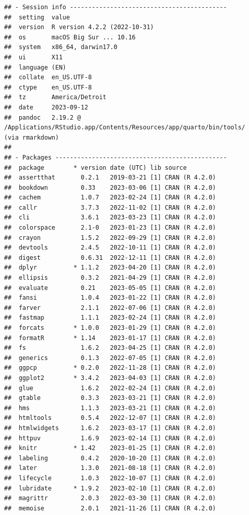 \documentclass[print]{nuthesis}
\begin{document}
\begin{verbatim}
## - Session info -------------------------------------------
##  setting  value
##  version  R version 4.2.2 (2022-10-31)
##  os       macOS Big Sur ... 10.16
##  system   x86_64, darwin17.0
##  ui       X11
##  language (EN)
##  collate  en_US.UTF-8
##  ctype    en_US.UTF-8
##  tz       America/Detroit
##  date     2023-09-12
##  pandoc   2.19.2 @ /Applications/RStudio.app/Contents/Resources/app/quarto/bin/tools/ (via rmarkdown)
## 
## - Packages -----------------------------------------------
##  package        * version date (UTC) lib source
##  assertthat       0.2.1   2019-03-21 [1] CRAN (R 4.2.0)
##  bookdown         0.33    2023-03-06 [1] CRAN (R 4.2.0)
##  cachem           1.0.7   2023-02-24 [1] CRAN (R 4.2.0)
##  callr            3.7.3   2022-11-02 [1] CRAN (R 4.2.0)
##  cli              3.6.1   2023-03-23 [1] CRAN (R 4.2.0)
##  colorspace       2.1-0   2023-01-23 [1] CRAN (R 4.2.0)
##  crayon           1.5.2   2022-09-29 [1] CRAN (R 4.2.0)
##  devtools         2.4.5   2022-10-11 [1] CRAN (R 4.2.0)
##  digest           0.6.31  2022-12-11 [1] CRAN (R 4.2.0)
##  dplyr          * 1.1.2   2023-04-20 [1] CRAN (R 4.2.0)
##  ellipsis         0.3.2   2021-04-29 [1] CRAN (R 4.2.0)
##  evaluate         0.21    2023-05-05 [1] CRAN (R 4.2.0)
##  fansi            1.0.4   2023-01-22 [1] CRAN (R 4.2.0)
##  farver           2.1.1   2022-07-06 [1] CRAN (R 4.2.0)
##  fastmap          1.1.1   2023-02-24 [1] CRAN (R 4.2.0)
##  forcats        * 1.0.0   2023-01-29 [1] CRAN (R 4.2.0)
##  formatR        * 1.14    2023-01-17 [1] CRAN (R 4.2.0)
##  fs               1.6.2   2023-04-25 [1] CRAN (R 4.2.0)
##  generics         0.1.3   2022-07-05 [1] CRAN (R 4.2.0)
##  ggpcp          * 0.2.0   2022-11-28 [1] CRAN (R 4.2.0)
##  ggplot2        * 3.4.2   2023-04-03 [1] CRAN (R 4.2.0)
##  glue             1.6.2   2022-02-24 [1] CRAN (R 4.2.0)
##  gtable           0.3.3   2023-03-21 [1] CRAN (R 4.2.0)
##  hms              1.1.3   2023-03-21 [1] CRAN (R 4.2.0)
##  htmltools        0.5.4   2022-12-07 [1] CRAN (R 4.2.0)
##  htmlwidgets      1.6.2   2023-03-17 [1] CRAN (R 4.2.0)
##  httpuv           1.6.9   2023-02-14 [1] CRAN (R 4.2.0)
##  knitr          * 1.42    2023-01-25 [1] CRAN (R 4.2.0)
##  labeling         0.4.2   2020-10-20 [1] CRAN (R 4.2.0)
##  later            1.3.0   2021-08-18 [1] CRAN (R 4.2.0)
##  lifecycle        1.0.3   2022-10-07 [1] CRAN (R 4.2.0)
##  lubridate      * 1.9.2   2023-02-10 [1] CRAN (R 4.2.0)
##  magrittr         2.0.3   2022-03-30 [1] CRAN (R 4.2.0)
##  memoise          2.0.1   2021-11-26 [1] CRAN (R 4.2.0)

\end{verbatim}
\end{document}
